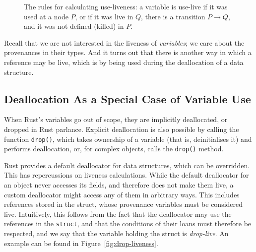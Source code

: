 \documentclass[11pt,a4paper,twoside,openany]{report}
\newcommand{\InRust}[1]{\texttt{#1}}
\begin{document}
\begin{figure}
  \caption[Rules for Calculating Use-Liveness]{The rules for calculating
    use-liveness: a variable is use-live if it was used at a node $P$, or if it
    was live in $Q$, there is a transition $P\rightarrow{}Q$, and it was not
    defined (killed) in $P$.}\label{fig:var-use-live}
\end{figure}

Recall that we are not interested in the liveness of \emph{variables};
we care about the provenances in their types. And it turns out that there is
another way in which a reference may be live, which is by being used during the
deallocation of a data structure.

\subsection{Deallocation As a Special Case of Variable Use}\label{sec:deall-as-spec}
When Rust's variables go out of scope, they are implicitly deallocated, or
dropped in Rust parlance. Explicit deallocation is also possible by calling the
function \InRust{drop()}, which takes ownership of a variable (that is,
deinitialises it) and performs deallocation, or, for complex objects, calls the
\InRust{drop()} method.

Rust provides a default deallocator for data structures, which can be
overridden. This has repercussions on liveness calculations. While the default
deallocator for an object never accesses its fields, and therefore does not make
them live, a custom deallocator might access any of them in arbitrary ways. This
includes references stored in the struct, whose provenance variables must be
considered live. Intuitively, this follows from the fact that the deallocator
may use the references in the \InRust{struct}, and that the conditions of their
loans must therefore be respected, and we say that the variable holding the
struct is \textit{drop-live}. An example can be found in
Figure~\ref{fig:drop-liveness}.
\end{document}
